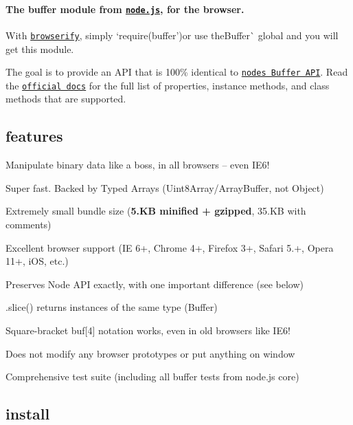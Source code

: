 \paragraph*{The buffer module from \href{http://nodejs.org/}{\tt node.\+js}, for the browser.}

\href{https://saucelabs.com/u/buffer}{\tt }

With \href{http://browserify.org}{\tt browserify}, simply `require(\textquotesingle{}buffer'){\ttfamily or use the}Buffer\`{} global and you will get this module.

The goal is to provide an A\+PI that is 100\% identical to \href{http://iojs.org/api/buffer.html}{\tt node\textquotesingle{}s Buffer A\+PI}. Read the \href{http://iojs.org/api/buffer.html}{\tt official docs} for the full list of properties, instance methods, and class methods that are supported.

\subsection*{features}


\begin{DoxyItemize}
\item Manipulate binary data like a boss, in all browsers -- even I\+E6!
\item Super fast. Backed by Typed Arrays ({\ttfamily Uint8\+Array}/{\ttfamily Array\+Buffer}, not {\ttfamily Object})
\item Extremely small bundle size ({\bfseries 5.\+KB minified + gzipped}, 35.\+KB with comments)
\item Excellent browser support (IE 6+, Chrome 4+, Firefox 3+, Safari 5.+, Opera 11+, i\+OS, etc.)
\item Preserves Node A\+PI exactly, with one important difference (see below)
\item {\ttfamily .slice()} returns instances of the same type (Buffer)
\item Square-\/bracket {\ttfamily buf\mbox{[}4\mbox{]}} notation works, even in old browsers like I\+E6!
\item Does not modify any browser prototypes or put anything on {\ttfamily window}
\item Comprehensive test suite (including all buffer tests from node.\+js core)
\end{DoxyItemize}

\subsection*{install}

